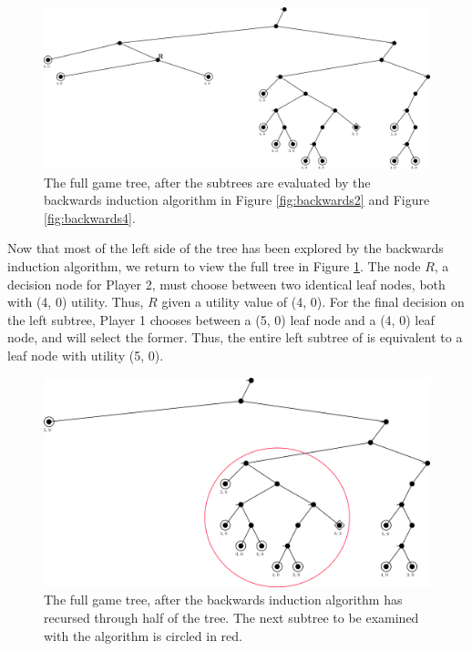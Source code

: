 \begin{figure}[H]
  \centering
  \includegraphics[width=13cm]{figures/Backwards5.png}
  \caption{The full game tree, after the subtrees are evaluated by the backwards induction algorithm in Figure \ref{fig:backwards2} and Figure \ref{fig:backwards4}.}
  \label{fig:backwards5}
\end{figure}
  
Now that most of the left side of the tree has been explored by the backwards induction algorithm, we return to view the full tree in Figure \ref{fig:backwards5}. The node $R$, a decision node for Player 2, must choose between two identical leaf nodes, both with (4, 0) utility. Thus, $R$ given a utility value of (4, 0). For the final decision on the left subtree, Player 1 chooses between a (5, 0) leaf node and a (4, 0) leaf node, and will select the former. Thus, the entire left subtree of is equivalent to a leaf node with utility (5, 0).

\begin{figure}[H]
  \centering
  \includegraphics[width=13cm]{figures/Backwards6.png}
  \caption{The full game tree, after the backwards induction algorithm has recursed through half of the tree. The next subtree to be examined with the algorithm is circled in red.}
  \label{fig:backwards6}
\end{figure}

